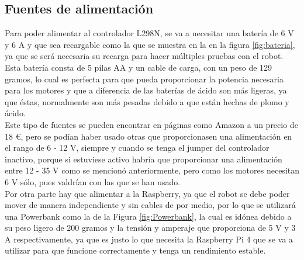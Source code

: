 \subsection{Fuentes de alimentación}
\label{subsec:fuentes_alimentacion}

Para poder alimentar al controlador L298N, se va a necesitar una batería de 6 V y 6 A y que sea recargable como la que se muestra en la 
en la figura \ref{fig:bateria}, ya que se será necesaria su recarga para hacer múltiples pruebas con el robot. Esta batería consta de 5 pilas AA y un cable de carga, con un peso de 129 gramos, lo cual es perfecta para que pueda proporcionar la potencia necesaria para los motores y que a diferencia de las baterías de ácido son más ligeras, ya que éstas, normalmente son más pesadas debido a que están hechas de plomo y ácido.\\

Este tipo de fuentes se pueden encontrar en páginas como Amazon a un precio de 18 \euro, pero se podían haber usado otras que proporcionasen una alimentación en el rango de 6 - 12 V, siempre y cuando se tenga el jumper del controlador inactivo, porque si estuviese activo habría que proporcionar una alimentación entre 12 - 35 V como se mencionó anteriormente, pero como los motores necesitan 6 V sólo, pues valdrían con las que se han usado. \\

Por otra parte hay que alimentar a la Raspberry, ya que el robot se debe poder mover de manera independiente y sin cables de por medio, por lo que se utilizará una Powerbank como la de la Figura \ref{fig:Powerbank}, la cual es idónea debido a su peso ligero de 200 gramos y la tensión y amperaje que proporciona de 5 V y 3 A respectivamente, ya que es justo lo que necesita la Raspberry Pi 4 que se va a utilizar para que funcione correctamente y tenga un rendimiento estable.

